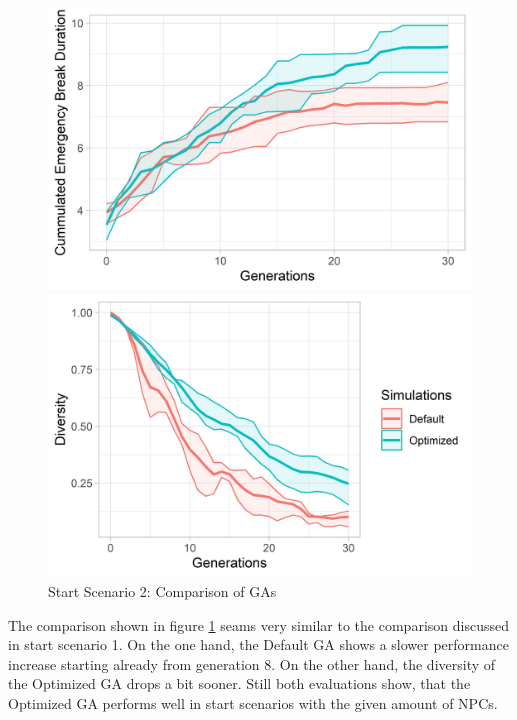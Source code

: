 \begin{figure}[ht] 
	\label{figure:sim_2_ga_comparison}
	\begin{minipage}[b]{0.5\linewidth}
		\centering
		\includegraphics[width=1\linewidth]{simulations/evaluation/plots/sim_2_ga_generations} 
	\end{minipage}%
	\begin{minipage}[b]{0.5\linewidth}
		\centering
		\includegraphics[width=1\linewidth]{simulations/evaluation/plots/sim_2_ga_diversity} 
	\end{minipage} 
	\caption{Start Scenario 2: Comparison of GAs}
\end{figure}

The comparison shown in figure \ref{figure:sim_2_ga_comparison} seams very similar to the comparison discussed in start scenario 1. On the one hand, the Default GA shows a slower performance increase starting already from generation 8. On the other hand, the diversity of the Optimized GA drops a bit sooner. Still both evaluations show, that the Optimized GA performs well in start scenarios with the given amount of NPCs.

